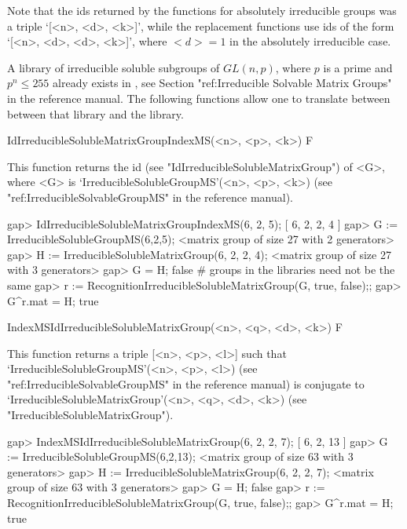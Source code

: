Note that the ids returned by the functions for absolutely irreducible groups was a triple `[<n>, <d>, <k>]', while the replacement functions use ids of the form `[<n>, <d>, <d>, <k>]', where $<d> = 1$ in the absolutely irreducible case.



A library of irreducible soluble subgroups of $GL(n, p)$, where $p$ is a 
prime and $p^n \leq 255$ already exists in {\GAP}, see Section "ref:Irreducible Solvable Matrix Groups" in the {\GAP} reference manual. The following functions
allow one to translate between between that library and the {\IRREDSOL} library. 


\>IdIrreducibleSolubleMatrixGroupIndexMS(<n>, <p>, <k>) F

This function returns the id (see "IdIrreducibleSolubleMatrixGroup") of <G>, 
where <G> is `IrreducibleSolubleGroupMS'(<n>, <p>, <k>) (see "ref:IrreducibleSolvableGroupMS" in the {\GAP} reference manual).

\beginexample
gap> IdIrreducibleSolubleMatrixGroupIndexMS(6, 2, 5);
[ 6, 2, 2, 4 ]
gap> G := IrreducibleSolubleGroupMS(6,2,5);
<matrix group of size 27 with 2 generators>
gap> H := IrreducibleSolubleMatrixGroup(6, 2, 2, 4);
<matrix group of size 27 with 3 generators>
gap> G = H;
false 
# groups in the libraries need not be the same
gap> r := RecognitionIrreducibleSolubleMatrixGroup(G, true, false);;
gap> G^r.mat = H;
true
\endexample

\>IndexMSIdIrreducibleSolubleMatrixGroup(<n>, <q>, <d>, <k>) F

This function returns a triple [<n>, <p>, <l>] such that
`IrreducibleSolubleGroupMS'(<n>, <p>, <l>) (see "ref:IrreducibleSolvableGroupMS" in the {\GAP} reference manual) is conjugate to
`IrreducibleSolubleMatrixGroup'(<n>, <q>, <d>, <k>) (see "IrreducibleSolubleMatrixGroup").

\beginexample
gap> IndexMSIdIrreducibleSolubleMatrixGroup(6, 2, 2, 7);
[ 6, 2, 13 ]
gap> G := IrreducibleSolubleGroupMS(6,2,13);
<matrix group of size 63 with 3 generators>
gap> H := IrreducibleSolubleMatrixGroup(6, 2, 2, 7);
<matrix group of size 63 with 3 generators>
gap> G = H;
false 
gap> r := RecognitionIrreducibleSolubleMatrixGroup(G, true, false);;
gap> G^r.mat = H;
true
\endexample



